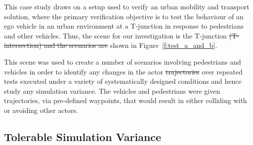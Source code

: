 \documentclass[letterpaper, 10 pt, journal, twoside]{IEEEtran}
\providecommand{\DIFaddtex}[1]{{\protect\color{blue}\uwave{#1}}} %
\providecommand{\DIFdeltex}[1]{{\protect\color{red}\sout{#1}}}                      %
\providecommand{\DIFaddbegin}{} %
\providecommand{\DIFaddend}{} %
\providecommand{\DIFdelbegin}{} %
\providecommand{\DIFdelend}{} %
\providecommand{\DIFadd}[1]{\texorpdfstring{\DIFaddtex{#1}}{#1}} %
\providecommand{\DIFdel}[1]{\texorpdfstring{\DIFdeltex{#1}}{}} %
\begin{document}
This case study draws on a setup used to verify an urban mobility and transport solution, where the primary verification objective is to test the behaviour of an ego vehicle in an urban environment at a T-junction in response to pedestrians and other vehicles.
%
Thus, the scene for our investigation is the T-junction \DIFdelbegin \DIFdel{(T-intersection) and the scenarios are }\DIFdelend \DIFaddbegin \DIFadd{with the scenarios as }\DIFaddend shown in Figure~\ref{f:test_a_and_b}.

This scene was used to create a number of scenarios involving pedestrians and vehicles in order to identify any changes in the actor \DIFdelbegin \DIFdel{trajectories }\DIFdelend \DIFaddbegin \DIFadd{paths }\DIFaddend over repeated tests executed under a variety of systematically designed conditions and hence study any simulation variance.
%
The vehicles and pedestrians were given trajectories, via pre-defined waypoints, that would result in either colliding with or avoiding other actors.





\subsection{Tolerable Simulation Variance}\DIFaddbegin \label{s:tolerance}
\DIFaddend 


\end{document}

